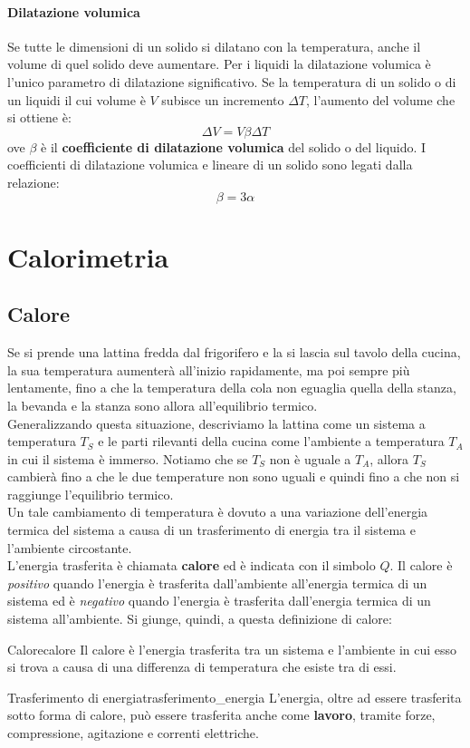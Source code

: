 \documentclass[12pt]{report}
\newcounter{definition}
\newcommand{\nmu}{}
\begin{document}
	\paragraph{Dilatazione volumica} Se tutte le dimensioni di un solido si dilatano con la temperatura, anche il volume di quel solido deve aumentare. Per i liquidi la dilatazione volumica è l'unico parametro di dilatazione significativo. Se la temperatura di un solido o di un liquidi il cui volume è $V$ subisce un incremento $\Delta T$, l'aumento del volume che si ottiene è:
	\[
	\Delta V = V \beta \Delta T
	\]
	ove $\beta$ è il \textbf{coefficiente di dilatazione volumica} del solido o del liquido. I coefficienti di dilatazione volumica e lineare di un solido sono legati dalla relazione:
	\[
	\beta = 3\alpha
	\]
	\section{Calorimetria}
	\subsection{Calore}
	Se si prende una lattina fredda dal frigorifero e la si lascia sul tavolo della cucina, la sua temperatura aumenterà all'inizio rapidamente, ma poi sempre più lentamente, fino a che la temperatura della cola non eguaglia quella della stanza, la bevanda e la stanza sono allora all'equilibrio termico. \\
	Generalizzando questa situazione, descriviamo la lattina come un sistema a temperatura $T_S$ e le parti rilevanti della cucina come l'ambiente a temperatura $T_A$ in cui il sistema è immerso. Notiamo che se $T_S$ non è uguale a $T_A$, allora $T_S$ cambierà fino a che le due temperature non sono uguali e quindi fino a che non si raggiunge l'equilibrio termico. \\
	Un tale cambiamento di temperatura è dovuto a una variazione dell'energia termica del sistema a causa di un trasferimento di energia tra il sistema e l'ambiente circostante. \\
	L'energia trasferita è chiamata \textbf{calore} ed è indicata con il simbolo $Q$. Il calore è \textit{positivo} quando l'energia è trasferita dall'ambiente all'energia termica di un sistema ed è \textit{negativo} quando l'energia è trasferita dall'energia termica di un sistema all'ambiente.
	Si giunge, quindi, a questa definizione di calore:
	\begin{definition}{\nmu Calore}{calore}
		Il calore è l'energia trasferita tra un sistema e l'ambiente in cui esso si trova a causa di una differenza di temperatura che esiste tra di essi.
	\end{definition}
	\begin{note}{\nmu Trasferimento di energia}{trasferimento_energia}
		L'energia, oltre ad essere trasferita sotto forma di calore, può essere trasferita anche come \textbf{lavoro}, tramite forze, compressione, agitazione e correnti elettriche.
	\end{note}
\end{document}
